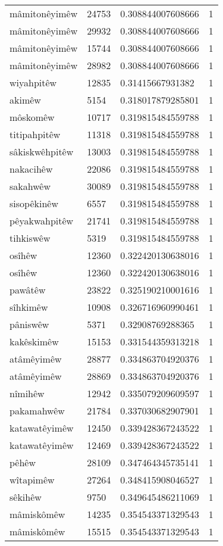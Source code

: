 \begin{longtable}{llll}
mâmitonêyimêw & 24753 & 0.308844007608666 & 1\\
mâmitonêyimêw & 29932 & 0.308844007608666 & 1\\
mâmitonêyimêw & 15744 & 0.308844007608666 & 1\\
mâmitonêyimêw & 28982 & 0.308844007608666 & 1\\
wiyahpitêw & 12835 & 0.31415667931382 & 1\\
akimêw & 5154 & 0.318017879285801 & 1\\
môskomêw & 10717 & 0.319815484559788 & 1\\
titipahpitêw & 11318 & 0.319815484559788 & 1\\
sâkiskwêhpitêw & 13003 & 0.319815484559788 & 1\\
nakacihêw & 22086 & 0.319815484559788 & 1\\
sakahwêw & 30089 & 0.319815484559788 & 1\\
sisopêkinêw & 6557 & 0.319815484559788 & 1\\
pêyakwahpitêw & 21741 & 0.319815484559788 & 1\\
tihkiswêw & 5319 & 0.319815484559788 & 1\\
osîhêw & 12360 & 0.322420130638016 & 1\\
osîhêw & 12360 & 0.322420130638016 & 1\\
pawâtêw & 23822 & 0.325190210001616 & 1\\
sîhkimêw & 10908 & 0.326716960990461 & 1\\
pâniswêw & 5371 & 0.32908769288365 & 1\\
kakêskimêw & 15153 & 0.331544359313218 & 1\\
atâmêyimêw & 28877 & 0.334863704920376 & 1\\
atâmêyimêw & 28869 & 0.334863704920376 & 1\\
nîmihêw & 12942 & 0.335079209609597 & 1\\
pakamahwêw & 21784 & 0.337030682907901 & 1\\
katawatêyimêw & 12450 & 0.339428367243522 & 1\\
katawatêyimêw & 12469 & 0.339428367243522 & 1\\
pêhêw & 28109 & 0.347464345735141 & 1\\
wîtapimêw & 27264 & 0.348415908046527 & 1\\
sêkihêw & 9750 & 0.349645486211069 & 1\\
mâmiskômêw & 14235 & 0.354543371329543 & 1\\
mâmiskômêw & 15515 & 0.354543371329543 & 1\\

\end{longtable}
